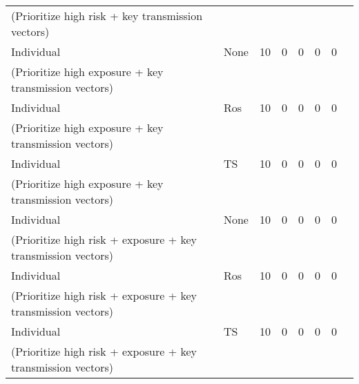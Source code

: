 \documentclass[a4paper]{article}
\begin{document}
\begin{landscape}
\begin{table}[]
\begin{tabular}{|l|l|l|l|l|l|l|l|}
				(Prioritize high risk + key transmission vectors) &  &  &  &  &  &  & \\
				Individual & None & 10 & 0 & 0 & 0 & 0  & \\
				(Prioritize high exposure + key transmission vectors) &  &  &  &  &  &  & \\
				Individual & Ros & 10 & 0 & 0 & 0 & 0  & \\
				(Prioritize high exposure + key transmission vectors) &  &  &  &  &  &  & \\
				Individual & TS & 10 & 0 & 0 & 0 & 0  & \\
				(Prioritize high exposure + key transmission vectors) &  &  &  &  &  &  & \\
				Individual & None & 10 & 0 & 0 & 0 & 0  & \\
				(Prioritize high risk + exposure + key transmission vectors) &  &  &  &  &  &  & \\
				Individual & Ros & 10 & 0 & 0 & 0 & 0  & \\
				(Prioritize high risk + exposure + key transmission vectors) &  &  &  &  &  &  & \\
				Individual & TS & 10 & 0 & 0 & 0 & 0  & \\
				(Prioritize high risk + exposure + key transmission vectors) &  &  &  &  &  &  & \\
				\hline \hline 
			\end{tabular}
		\end{table}
		

\end{landscape}
\end{document}
